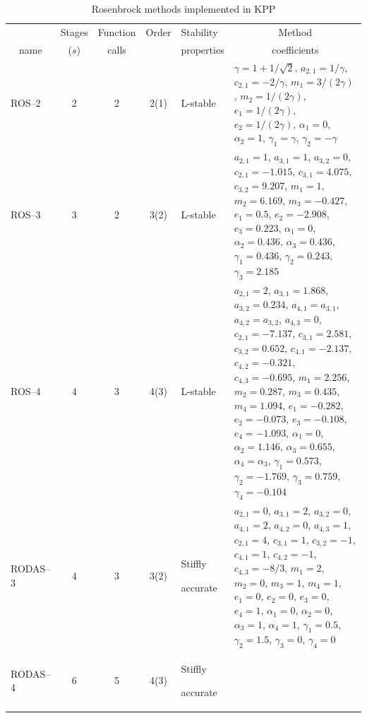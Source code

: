 \documentclass[twoside]{article}
\newcommand{\hhline}{\noalign{\vspace{1mm}}\hline\noalign{\vspace{1mm}}}
\begin{document}
\begin{table}
\begin{center}
\caption{Rosenbrock methods implemented in KPP}
\label{tab:Rosenbrock}
\begin{tabular}{lcccp{1.5cm}p{9.5cm}}
\hhline
\multicolumn{1}{c}{Method} & Stages & Function & Order & Stability  & 
\multicolumn{1}{c}{Method}\\
\multicolumn{1}{c}{name}   & ($s$)  & calls    &       & properties & 
\multicolumn{1}{c}{coefficients}\\
\hhline
ROS--2 & 2 & 2 & 2(1) & L-stable &
  $\gamma = 1 + 1/\sqrt{2}$,
  $a_{2,1} = 1/\gamma$,
  $c_{2,1} = -2/\gamma$,
  $m_1 = 3/(2\gamma)$,
  $m_2 = 1/(2\gamma)$,
  $e_1 = 1/(2\gamma)$,
  $e_2 = 1/(2\gamma)$,
  $\alpha_1 = 0$,
  $\alpha_2 = 1$,
  $\gamma_1 = \gamma$,
  $\gamma_2 = -\gamma$\\
ROS--3 & 3 & 2 & 3(2) & L-stable & 
  $a_{2,1} = 1$,
  $a_{3,1} = 1$,
  $a_{3,2} = 0$,
  $c_{2,1} = -1.015$,
  $c_{3,1} = 4.075$,
  $c_{3,2} = 9.207$,
  $m_1 = 1$,
  $m_2 = 6.169$,
  $m_3 = -0.427$,
  $e_1 = 0.5$,
  $e_2 = -2.908$,
  $e_3 = 0.223$,
  $\alpha_1 = 0$,
  $\alpha_2 = 0.436$,
  $\alpha_3 = 0.436$,
  $\gamma_1 = 0.436$,
  $\gamma_2 = 0.243$,
  $\gamma_3 = 2.185$\\
ROS--4 & 4 & 3 & 4(3) & L-stable & 
  $a_{2,1} = 2$,
  $a_{3,1} = 1.868$,
  $a_{3,2} = 0.234$,
  $a_{4,1} = a_{3,1}$,
  $a_{4,2} = a_{3,2}$,
  $a_{4,3} = 0$,
  $c_{2,1} = -7.137$,
  $c_{3,1} = 2.581$,
  $c_{3,2} = 0.652$,
  $c_{4,1} = -2.137$,
  $c_{4,2} = -0.321$,
  $c_{4,3} = -0.695$,
  $m_1 = 2.256$,
  $m_2 = 0.287$,
  $m_3 = 0.435$,
  $m_4 = 1.094$,
  $e_1 = -0.282$,
  $e_2 = -0.073$,
  $e_3 = -0.108$,
  $e_4 = -1.093$,
  $\alpha_1 = 0$,
  $\alpha_2 = 1.146$,
  $\alpha_3 = 0.655$,
  $\alpha_4 = \alpha_3$,
  $\gamma_1 = 0.573$,
  $\gamma_2 = -1.769$,
  $\gamma_3 = 0.759$,
  $\gamma_4 = -0.104$\\
RODAS--3 & 4 & 3 & 3(2) & Stiffly\par accurate & 
  $a_{2,1} = 0$,
  $a_{3,1} = 2$,
  $a_{3,2} = 0$,
  $a_{4,1} = 2$,
  $a_{4,2} = 0$,
  $a_{4,3} = 1$,
  $c_{2,1} = 4$,
  $c_{3,1} = 1$,
  $c_{3,2} = -1$,
  $c_{4,1} = 1$,
  $c_{4,2} = -1$,
  $c_{4,3} = -8/3$,
  $m_1 = 2$,
  $m_2 = 0$,
  $m_3 = 1$,
  $m_4 = 1$,
  $e_1 = 0$,
  $e_2 = 0$,
  $e_3 = 0$,
  $e_4 = 1$,
  $\alpha_1 = 0$,
  $\alpha_2 = 0$,
  $\alpha_3 = 1$,
  $\alpha_4 = 1$,
  $\gamma_1 = 0.5$,
  $\gamma_2 = 1.5$,
  $\gamma_3 = 0$,
  $\gamma_4 = 0$\\
RODAS--4 & 6 & 5 & 4(3) & Stiffly\par accurate &

\end{tabular}
\end{center}
\end{table}
\end{document}
